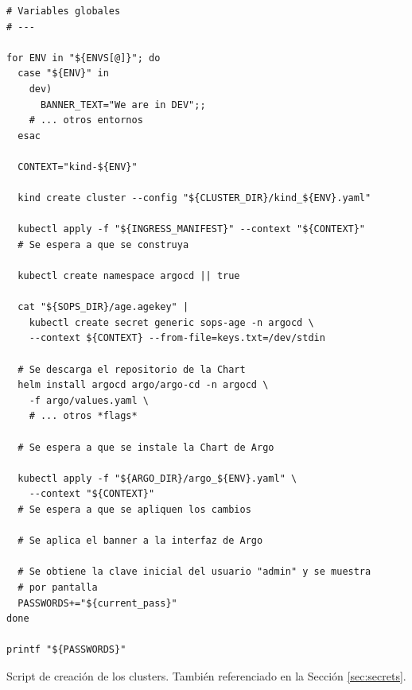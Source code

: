 \begin{longlisting}
  \begin{verbatim}
# Variables globales
# ---

for ENV in "${ENVS[@]}"; do
  case "${ENV}" in
    dev)
      BANNER_TEXT="We are in DEV";;
    # ... otros entornos
  esac

  CONTEXT="kind-${ENV}"

  kind create cluster --config "${CLUSTER_DIR}/kind_${ENV}.yaml"

  kubectl apply -f "${INGRESS_MANIFEST}" --context "${CONTEXT}"
  # Se espera a que se construya

  kubectl create namespace argocd || true

  cat "${SOPS_DIR}/age.agekey" |
    kubectl create secret generic sops-age -n argocd \
    --context ${CONTEXT} --from-file=keys.txt=/dev/stdin

  # Se descarga el repositorio de la Chart
  helm install argocd argo/argo-cd -n argocd \
    -f argo/values.yaml \
    # ... otros *flags*

  # Se espera a que se instale la Chart de Argo

  kubectl apply -f "${ARGO_DIR}/argo_${ENV}.yaml" \
    --context "${CONTEXT}"
  # Se espera a que se apliquen los cambios

  # Se aplica el banner a la interfaz de Argo

  # Se obtiene la clave inicial del usuario "admin" y se muestra
  # por pantalla
  PASSWORDS+="${current_pass}"
done

printf "${PASSWORDS}"
\end{verbatim}
\caption{Script de creación de los clusters. También referenciado en la Sección \ref{sec:secrets}.}
\label{lst:create-clusters}
\end{longlisting}

